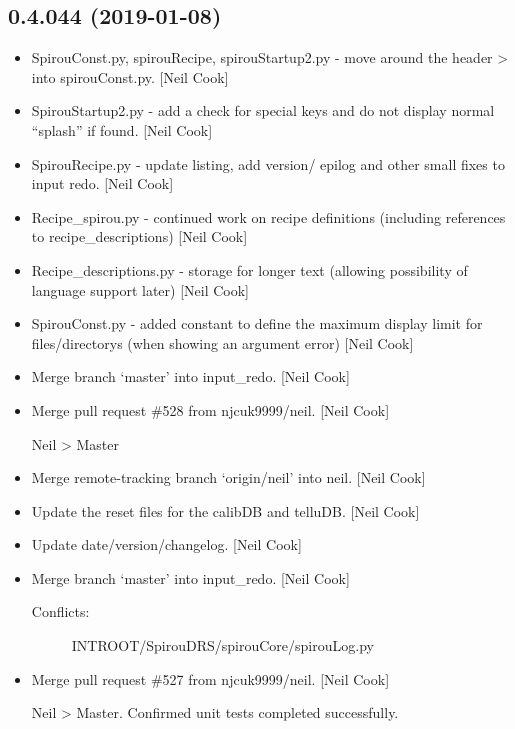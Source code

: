 \documentclass[a4paper,10pt,english]{report}
\begin{document}
\subsection{0.4.044 (2019-01-08)}
\label{\detokenize{misc/changelog:id219}}\begin{itemize}
\item {} 
SpirouConst.py, spirouRecipe, spirouStartup2.py - move around the
header \textendash{}\textgreater{} into spirouConst.py. {[}Neil Cook{]}

\item {} 
SpirouStartup2.py - add a check for special keys and do not display
normal “splash” if found. {[}Neil Cook{]}

\item {} 
SpirouRecipe.py - update listing, add version/ epilog and other small
fixes to input redo. {[}Neil Cook{]}

\item {} 
Recipe\_spirou.py - continued work on recipe definitions (including
references to recipe\_descriptions) {[}Neil Cook{]}

\item {} 
Recipe\_descriptions.py - storage for longer text (allowing possibility
of language support later) {[}Neil Cook{]}

\item {} 
SpirouConst.py - added constant to define the maximum display limit
for files/directorys (when showing an argument error) {[}Neil Cook{]}

\item {} 
Merge branch ‘master’ into input\_redo. {[}Neil Cook{]}

\item {} 
Merge pull request \#528 from njcuk9999/neil. {[}Neil Cook{]}

Neil \textendash{}\textgreater{} Master

\item {} 
Merge remote-tracking branch ‘origin/neil’ into neil. {[}Neil Cook{]}

\item {} 
Update the reset files for the calibDB and telluDB. {[}Neil Cook{]}

\item {} 
Update date/version/changelog. {[}Neil Cook{]}

\item {} 
Merge branch ‘master’ into input\_redo. {[}Neil Cook{]}
\begin{description}
\item[{Conflicts:}] \leavevmode
INTROOT/SpirouDRS/spirouCore/spirouLog.py

\end{description}

\item {} 
Merge pull request \#527 from njcuk9999/neil. {[}Neil Cook{]}

Neil \textendash{}\textgreater{} Master. Confirmed unit tests completed successfully.

\end{itemize}
\end{document}

